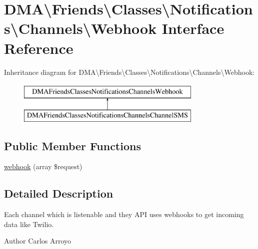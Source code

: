 \hypertarget{interfaceDMA_1_1Friends_1_1Classes_1_1Notifications_1_1Channels_1_1Webhook}{\section{D\+M\+A\textbackslash{}Friends\textbackslash{}Classes\textbackslash{}Notifications\textbackslash{}Channels\textbackslash{}Webhook Interface Reference}
\label{interfaceDMA_1_1Friends_1_1Classes_1_1Notifications_1_1Channels_1_1Webhook}
}
Inheritance diagram for D\+M\+A\textbackslash{}Friends\textbackslash{}Classes\textbackslash{}Notifications\textbackslash{}Channels\textbackslash{}Webhook\+:\begin{figure}[H]
\begin{center}
\leavevmode
\includegraphics[height=2.000000cm]{d8/d62/interfaceDMA_1_1Friends_1_1Classes_1_1Notifications_1_1Channels_1_1Webhook}
\end{center}
\end{figure}
\subsection*{Public Member Functions}
\begin{DoxyCompactItemize}
\item 
\hyperlink{interfaceDMA_1_1Friends_1_1Classes_1_1Notifications_1_1Channels_1_1Webhook_a2836b9b100c55f657ee432bf3a7c9055}{webhook} (array \$request)
\end{DoxyCompactItemize}


\subsection{Detailed Description}
Each channel which is listenable and they A\+P\+I uses webhooks to get incoming data like Twilio. \begin{DoxyAuthor}{Author}
Carlos Arroyo 
\end{DoxyAuthor}


